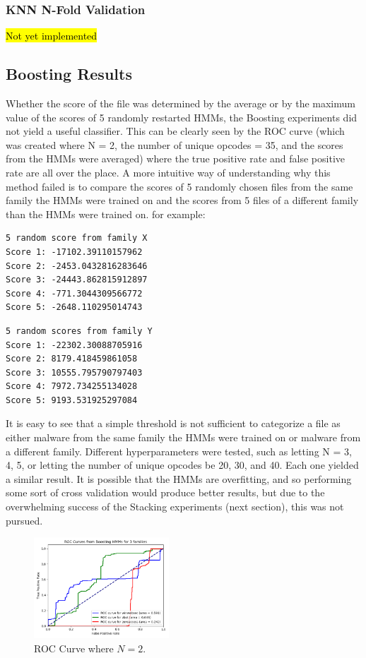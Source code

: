 \documentclass[12pt]{article}
\begin{document}
  \subsubsection{KNN N-Fold Validation}
  \hl{Not yet implemented}

 \subsection{Boosting Results}
Whether the score of the file was determined by the average or by the maximum value of the scores of 5 randomly restarted HMMs, the Boosting experiments did not yield a useful classifier. This can be clearly seen by the ROC curve (which was created where N = 2, the number of unique opcodes = 35, and the scores from the HMMs were averaged) where the true positive rate and false positive rate are all over the place. A more intuitive way of understanding why this method failed is to compare the scores of 5 randomly chosen files from the same family the HMMs were trained on and the scores from 5 files of a different family than the HMMs were trained on. 
for example:
\begin{lstlisting}
5 random score from family X
Score 1: -17102.39110157962
Score 2: -2453.0432816283646
Score 3: -24443.862815912897
Score 4: -771.3044309566772
Score 5: -2648.110295014743
\end{lstlisting}
\begin{lstlisting}
5 random scores from family Y
Score 1: -22302.30088705916
Score 2: 8179.418459861058
Score 3: 10555.795790797403
Score 4: 7972.734255134028
Score 5: 9193.531925297084
\end{lstlisting}
It is easy to see that a simple threshold is not sufficient to categorize a file as either malware from the same family the HMMs were trained on or malware from a different family. Different hyperparameters were tested, such as letting N = 3, 4, 5, or letting the number of unique opcodes be 20, 30, and 40. Each one yielded a similar result. It is possible that the HMMs are overfitting, and so performing some sort of cross validation would produce better results, but due to the overwhelming success of the Stacking experiments (next section), this was not pursued.
\begin{figure}[H]
\centering
\includegraphics[width=0.45\textwidth]{Boosting.png}
\caption{ROC Curve where $N=2$.}
\end{figure}
\end{document}
